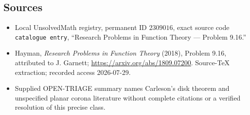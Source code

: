 \documentclass[11pt]{article}
\begin{document}
\subsection{Sources}
\begin{itemize}
\item Local UnsolvedMath registry, permanent ID \(2309016\), exact source code \texttt{catalogue entry}, ``Research Problems in Function Theory --- Problem 9.16.''
\item Hayman, \emph{Research Problems in Function Theory} (2018), Problem 9.16, attributed to J. Garnett; \url{https://arxiv.org/abs/1809.07200}. Source-TeX extraction; recorded access 2026-07-29.
\item Supplied OPEN-TRIAGE summary names Carleson's disk theorem and unspecified planar corona literature without complete citations or a verified resolution of this precise class.
\end{itemize}
\end{document}
